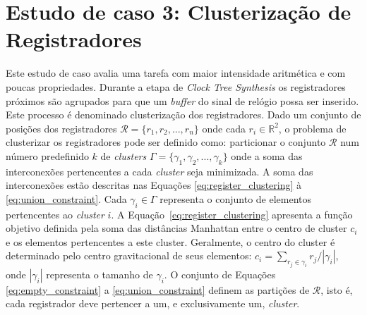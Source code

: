 



\section{Estudo de caso 3: Clusterização de Registradores}
\label{sec:estudo_de_caso_3}

Este estudo de caso avalia uma tarefa com maior intensidade aritmética e com poucas propriedades.
Durante a etapa de \textit{Clock Tree Synthesis} os registradores próximos são agrupados para que um \textit{buffer} do sinal de relógio possa ser inserido. Este processo é denominado clusterização dos registradores. Dado um conjunto de posições dos registradores $\mathcal{R} = \{r_1, r_2, ..., r_n\}$ onde cada $r_i \in \mathbb{R}^2$, o problema de clusterizar os registradores pode ser definido como: particionar o conjunto $\mathcal{R}$ num número predefinido $k$ de \textit{clusters} $\Gamma = \{\gamma_1, \gamma_2, ..., \gamma_k\}$ onde a soma das interconexões pertencentes a cada \textit{cluster} seja minimizada. A soma das interconexões estão descritas nas Equações \eqref{eq:register_clustering} à \eqref{eq:union_constraint}.
Cada $\gamma_i \in \Gamma$ representa o conjunto de elementos pertencentes ao \textit{cluster} $i$.
A Equação~\eqref{eq:register_clustering} apresenta a função objetivo definida pela soma das distâncias Manhattan entre o centro de cluster $c_i$ e os elementos pertencentes a este cluster.
Geralmente, o centro do cluster é determinado pelo centro gravitacional de seus elementos: $c_i = \sum_{r_j \in \gamma_i} r_j/|\gamma_i|$, onde $|\gamma_i|$ representa o tamanho  de $\gamma_i$.
O conjunto de Equações \eqref{eq:empty_constraint} a \eqref{eq:union_constraint} definem as partições de $\mathcal{R}$, isto é, cada registrador deve pertencer a um, e exclusivamente um, \textit{cluster}.


